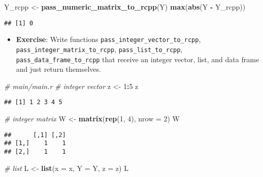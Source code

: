 \documentclass[
]{book}
\newenvironment{Shaded}{\begin{snugshade}}{\end{snugshade}}
\newcommand{\CommentTok}[1]{\textcolor[rgb]{0.56,0.35,0.01}{\textit{#1}}}
\newcommand{\DataTypeTok}[1]{\textcolor[rgb]{0.13,0.29,0.53}{#1}}
\newcommand{\DecValTok}[1]{\textcolor[rgb]{0.00,0.00,0.81}{#1}}
\newcommand{\KeywordTok}[1]{\textcolor[rgb]{0.13,0.29,0.53}{\textbf{#1}}}
\newcommand{\NormalTok}[1]{#1}
\newcommand{\OperatorTok}[1]{\textcolor[rgb]{0.81,0.36,0.00}{\textbf{#1}}}
\newcommand{\StringTok}[1]{\textcolor[rgb]{0.31,0.60,0.02}{#1}}
\providecommand{\tightlist}{%
  \setlength{\itemsep}{0pt}\setlength{\parskip}{0pt}}
\begin{document}
\begin{Shaded}
\begin{Highlighting}[]
\NormalTok{Y_rcpp <-}\StringTok{ }\KeywordTok{pass_numeric_matrix_to_rcpp}\NormalTok{(Y)}
\KeywordTok{max}\NormalTok{(}\KeywordTok{abs}\NormalTok{(Y }\OperatorTok{-}\StringTok{ }\NormalTok{Y_rcpp))}
\end{Highlighting}
\end{Shaded}

\begin{verbatim}
## [1] 0
\end{verbatim}

\begin{itemize}
\tightlist
\item
  \textbf{Exercise}: Write functions \texttt{pass\_integer\_vector\_to\_rcpp}, \texttt{pass\_integer\_matrix\_to\_rcpp}, \texttt{pass\_list\_to\_rcpp}, \texttt{pass\_data\_frame\_to\_rcpp} that receive an integer vector, list, and data frame and just return themselves.
\end{itemize}

\begin{Shaded}
\begin{Highlighting}[]
\CommentTok{# main/main.r}
\CommentTok{# integer vector}
\NormalTok{z <-}\StringTok{ }\DecValTok{1}\OperatorTok{:}\DecValTok{5}
\NormalTok{z}
\end{Highlighting}
\end{Shaded}

\begin{verbatim}
## [1] 1 2 3 4 5
\end{verbatim}

\begin{Shaded}
\begin{Highlighting}[]
\CommentTok{# integer matrix}
\NormalTok{W <-}\StringTok{ }\KeywordTok{matrix}\NormalTok{(}\KeywordTok{rep}\NormalTok{(}\DecValTok{1}\NormalTok{, }\DecValTok{4}\NormalTok{), }\DataTypeTok{nrow =} \DecValTok{2}\NormalTok{)}
\NormalTok{W}
\end{Highlighting}
\end{Shaded}

\begin{verbatim}
##      [,1] [,2]
## [1,]    1    1
## [2,]    1    1
\end{verbatim}

\begin{Shaded}
\begin{Highlighting}[]
\CommentTok{# list}
\NormalTok{L <-}\StringTok{ }\KeywordTok{list}\NormalTok{(}\DataTypeTok{x =}\NormalTok{ x, }\DataTypeTok{Y =}\NormalTok{ Y, }\DataTypeTok{z =}\NormalTok{ z)}
\NormalTok{L}
\end{Highlighting}
\end{Shaded}
\end{document}
